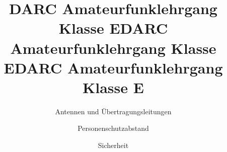 \documentclass[aspectratio = 169]{beamer}
\begin{document}
\title{DARC Amateurfunklehrgang Klasse E}
\author{Antennen und Übertragungsleitungen}
\begin{frame}
\maketitle
\end{frame}


















\title{DARC Amateurfunklehrgang Klasse E}
\author{Personenschutzabstand}
\begin{frame}
\maketitle
\end{frame}






\title{DARC Amateurfunklehrgang Klasse E}
\author{Sicherheit}
\begin{frame}
\maketitle
\end{frame}






\end{document}
